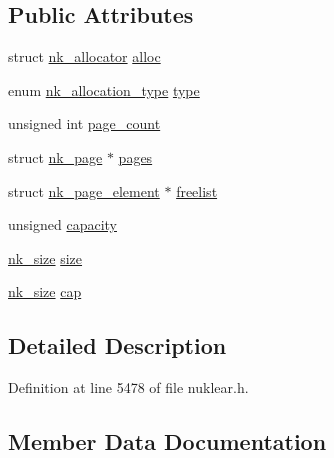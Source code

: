 \subsection*{Public Attributes}
\begin{DoxyCompactItemize}
\item 
struct \mbox{\hyperlink{structnk__allocator}{nk\+\_\+allocator}} \mbox{\hyperlink{structnk__pool_a2644741d1433862d67e1046fb2101f10}{alloc}}
\item 
enum \mbox{\hyperlink{nuklear_8h_aa988e58afebdfa0bbd380ed643f913ec}{nk\+\_\+allocation\+\_\+type}} \mbox{\hyperlink{structnk__pool_ae622d2f8662677712eb3644a8dd4008c}{type}}
\item 
unsigned int \mbox{\hyperlink{structnk__pool_a36add32173cf3c647a13bf163a26384b}{page\+\_\+count}}
\item 
struct \mbox{\hyperlink{structnk__page}{nk\+\_\+page}} $\ast$ \mbox{\hyperlink{structnk__pool_ae85bca8b0974e60bdf2dfadc3587848f}{pages}}
\item 
struct \mbox{\hyperlink{structnk__page__element}{nk\+\_\+page\+\_\+element}} $\ast$ \mbox{\hyperlink{structnk__pool_a63aca14faed2e7d08a74d7bc3bd06872}{freelist}}
\item 
unsigned \mbox{\hyperlink{structnk__pool_ad65a0bf770d9244c15d76669082249a1}{capacity}}
\item 
\mbox{\hyperlink{nuklear_8h_a84c0fc50dec5501be327b33d41d9010c}{nk\+\_\+size}} \mbox{\hyperlink{structnk__pool_a5995fa53f2098e079e47928e260120ac}{size}}
\item 
\mbox{\hyperlink{nuklear_8h_a84c0fc50dec5501be327b33d41d9010c}{nk\+\_\+size}} \mbox{\hyperlink{structnk__pool_a7eb35ea500f4832024688285f1394df0}{cap}}
\end{DoxyCompactItemize}


\subsection{Detailed Description}


Definition at line 5478 of file nuklear.\+h.



\subsection{Member Data Documentation}
\mbox{\label{structnk__pool_a2644741d1433862d67e1046fb2101f10}} 
